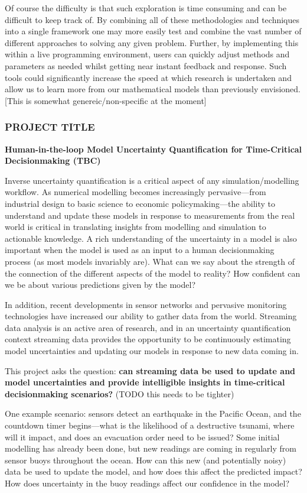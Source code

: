 \documentclass[a4paper,fontsize=12pt]{scrartcl}
\begin{document}
Of course the difficulty is that such exploration is time consuming
and can be difficult to keep track of. By combining all of these
methodologies and techniques into a single framework one may more
easily test and combine the vast number of different approaches to
solving any given problem. Further, by implementing this within a live
programming environment, users can quickly adjust methods and
parameters as needed whilst getting near instant feedback and
response. Such tools could significantly increase the speed at which
research is undertaken and allow us to learn more from our
mathematical models than previously envisioned. [This is somewhat
genereic/non-specific at the moment]


\subsubsection*{PROJECT TITLE}

\textbf{Human-in-the-loop Model Uncertainty Quantification for
  Time-Critical Decisionmaking (TBC)}

Inverse uncertainty quantification is a critical aspect of any
simulation/modelling workflow. As numerical modelling becomes
increasingly pervasive---from industrial design to basic science to
economic policymaking---the ability to understand and update these
models in response to measurements from the real world is critical in
translating insights from modelling and simulation to actionable
knowledge. A rich understanding of the uncertainty in a model is also
important when the model is used as an input to a human decisionmaking
process (as most models invariably are). What can we say about the
strength of the connection of the different aspects of the model to
reality? How confident can we be about various predictions given by
the model?

In addition, recent developments in sensor networks and pervasive
monitoring technologies have increased our ability to gather data from
the world. Streaming data analysis is an active area of research, and
in an uncertainty quantification context streaming data provides the
opportunity to be continuously estimating model uncertainties and
updating our models in response to new data coming in.

This project asks the question: \textbf{can streaming data be used to
  update and model uncertainties and provide intelligible insights in
  time-critical decisionmaking scenarios?} (TODO this needs to be
tighter)

One example scenario: sensors detect an earthquake in the Pacific Ocean,
and the countdown timer begins---what is the likelihood of a
destructive tsunami, where will it impact, and does an evacuation
order need to be issued? Some initial modelling has already been done,
but new readings are coming in regularly from sensor buoys throughout
the ocean. How can this new (and potentially noisy) data be used to
update the model, and how does this affect the predicted impact? How
does uncertainty in the buoy readings affect our confidence in the
model?
\end{document}
